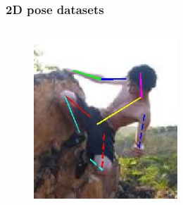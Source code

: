 \documentclass[9pt]{beamer}
\newenvironment{myframe}[1][]{%
\begin{frame}%
\frametitle{#1}
\setcounter{footnote}{0}


}{%
\end{frame}%
}
\begin{document}
\begin{myframe}[2D pose datasets]
\begin{columns}[T]
\begin{column}{.48\textwidth}
\begin{figure}
              \includegraphics[width=0.48\textwidth]{lsp-annotated.jpg}
          \end{figure}
      \end{column}
  \end{columns}
\end{myframe}
\end{document}
